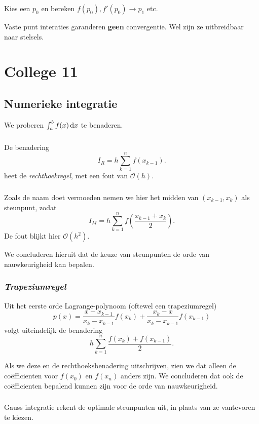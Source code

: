 \documentclass{2wn20summary}
\begin{document}
				Kies een $ p_0 $ en bereken $ f(p_0), f'(p_0) \to p_1$ etc.

				\begin{opm}
					Vaste punt interaties garanderen \textbf{geen} convergentie. Wel zijn ze uitbreidbaar naar stelsels.
				\end{opm}
        \newpage
	\section{College 11}
		\subsection{Numerieke integratie}
		We proberen $ \int_a^b f(x) \mathop{}\!\mathrm{d} x $ te benaderen.
		\subsubsection{}
			De benadering
			\[
				I_R = h \sum_{k=1}^{n} f(x_{k-1}).
			 \]
			 heet de \textit{rechthoekregel}, met een fout van $\mathcal{O}(h)$.
		\subsubsection{}
			Zoals de naam doet vermoeden nemen we hier het midden van $(x_{k-1},x_k)$ als steunpunt, zodat
			\[
				I_M = h \sum_{k=1}^n f(\frac{x_{k-1}+x_k}{2}).
			 \]
			 De fout blijkt hier $\mathcal O (h^2)$.

			 We concluderen hieruit dat de keuze van steunpunten de orde van nauwkeurigheid kan bepalen.
		\subsubsection{\textit{Trapeziumregel}}
			Uit het eerste orde Lagrange-polynoom (oftewel een trapeziumregel)
			\[
				p(x) = \frac{x-x_{k-1}}{x_k - x_{k-1}}f(x_k) + \frac{x_k - x}{x_k-x_{k-1}}f(x_{k-1})
			 \]
			 volgt uiteindelijk de benadering
			 \[
				 h \sum_{k=1}^n \frac{f(x_k)+f(x_{k-1})}{2}.
			  \]

			  Als we deze en de rechthoeksbenadering uitschrijven, zien we dat alleen de co\"efficienten voor $f(x_0)$ en $f(x_n)$ anders zijn. We concluderen dat ook de co\"efficienten bepalend kunnen zijn voor de orde van nauwkeurigheid.

		\subsubsection{}
			Gauss integratie rekent de optimale steunpunten uit, in plaats van ze vantevoren te kiezen.
\end{document}
